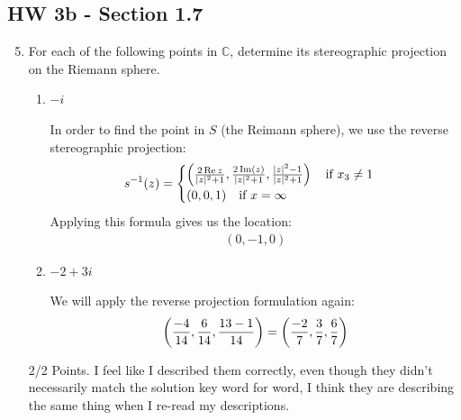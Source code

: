 \subsection*{HW 3b - Section 1.7}
\begin{enumerate}
\setcounter{enumi}{4}
    \item For each of the following points in $\mathbb{C}$, determine its stereographic projection on the Riemann sphere.
    \begin{enumerate}
        \item $-i$
		\begin{problem}
			In order to find the point in $S$ (the Reimann sphere), we use the reverse stereographic projection:
			\begin{align*}
				s^{-1}(z)=\begin{cases}
					\left(\frac{2\operatorname{Re}{z}}{|z|^2+1},\frac{2\operatorname{Im}(z)}{|z|^2+1}, \frac{|z|^2-1}{|z|^2+1}\right)\quad \text{if }x_3\ne 1\\
					(0,0,1)\quad\text{if }x = \infty
				\end{cases}
			\end{align*}
			Applying this formula gives us the location:
			\begin{align*}
				(0, -1,0) 
			\end{align*}
		\end{problem}
        \item $-2+3i$
		\begin{problem}
			We will apply the reverse projection formulation again:
			\begin{align*}
				\left(\frac{-4}{14},\frac{6}{14},\frac{13-1}{14}\right) = \left(\frac{-2}7, \frac{3}{7}, \frac{6}7\right)
			\end{align*}
		\end{problem}
    \end{enumerate}
	\begin{grade}
		2/2 Points.\gline{}
		I feel like I described them correctly, even though they didn't necessarily match the solution key word for word, I think they are describing the same thing when I re-read my descriptions. 
	\end{grade}


\end{enumerate}
